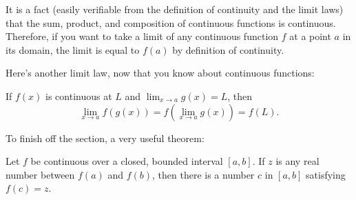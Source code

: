 It is a fact (easily verifiable from the definition of continuity and the limit laws) that the sum, product, and composition of continuous functions is continuous. Therefore, if you want to take a limit of any continuous function $f$ at a point $a$ in its domain, the limit is equal to $f(a)$ by definition of continuity.

\vspace{1em}

\noindent Here's another limit law, now that you know about continuous functions:

\begin{thm}
If $f(x)$ is continuous at $L$ and $\displaystyle\lim _{x \to a} g(x)=L$, then
$$\lim _{x \to a} f(g(x))=f\left(\lim _{x \to a} g(x)\right)=f(L).$$
\end{thm}

\noindent To finish off the section, a very useful theorem:

\begin{thm}
Let $f$ be continuous over a closed, bounded interval $[a, b]$. If $z$ is any real number between $f(a)$ and $f(b)$, then there is a number $c$ in $[a, b]$ satisfying $f(c)=z$.
\end{thm}

